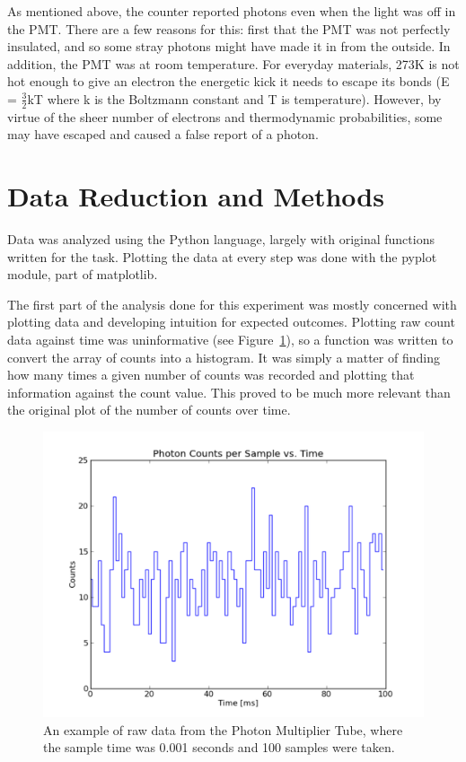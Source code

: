 \documentclass[a4paper,12pt]{article}
\begin{document}
As mentioned above, the counter reported photons even when the light was off in the PMT. There are a few reasons for this: first that the PMT was not perfectly insulated, and so some stray photons might have made it in from the outside. In addition, the PMT was at room temperature. For everyday materials, 273K is not hot enough to give an electron the energetic kick it needs to escape its bonds (E = $\frac{3}{2}$kT where k is the Boltzmann constant and T is temperature). However, by virtue of the sheer number of electrons and thermodynamic probabilities, some may have escaped and caused a false report of a photon. 

\section {Data Reduction and Methods}
\label{sec:methods}

Data was analyzed using the Python language, largely with original functions written for the task. Plotting the data at every step was done with the pyplot module, part of matplotlib.

The first part of the analysis done for this experiment was mostly concerned with plotting data and developing intuition for expected outcomes. Plotting raw count data against time was uninformative (see Figure~\ref{fig:section4}), so a function was written to convert the array of counts into a histogram. It was simply a matter of finding how many times a given number of counts was recorded and plotting that information against the count value. This proved to be much more relevant than the original plot of the number of counts over time.

\begin{figure}[h]
\centering
\includegraphics[width=\linewidth]{section4image.pdf}
\caption{An example of raw data from the Photon Multiplier Tube, where the sample time was 0.001 seconds and 100 samples were taken.}
\label{fig:section4}
\end{figure}
\end{document}
